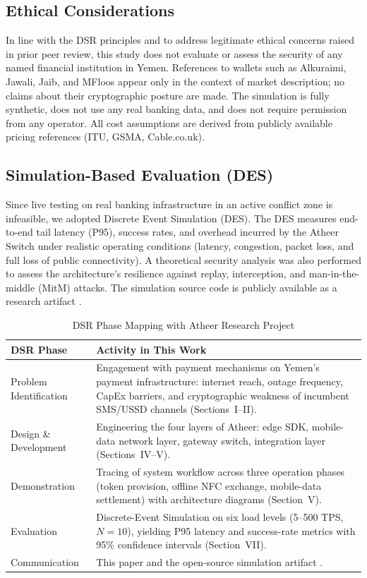 \documentclass[conference,10pt]{IEEEtran}
\begin{document}
\subsection{Ethical Considerations}

In line with the DSR principles and to address legitimate ethical concerns raised in prior peer review, this study does not evaluate or assess the security of any named financial institution in Yemen. References to wallets such as Alkuraimi, Jawali, Jaib, and MFloos appear only in the context of market description; no claims about their cryptographic posture are made. The simulation is fully synthetic, does not use any real banking data, and does not require permission from any operator. All cost assumptions are derived from publicly available pricing references (ITU, GSMA, Cable.co.uk).

\subsection{Simulation-Based Evaluation (DES)}

Since live testing on real banking infrastructure in an active conflict zone is infeasible, we adopted Discrete Event Simulation (DES). The DES measures end-to-end tail latency (P95), success rates, and overhead incurred by the Atheer Switch under realistic operating conditions (latency, congestion, packet loss, and full loss of public connectivity). A theoretical security analysis was also performed to assess the architecture's resilience against replay, interception, and man-in-the-middle (MitM) attacks. The simulation source code is publicly available as a research artifact \cite{mutawakel2024}.

\begin{table}[t]
\caption{DSR Phase Mapping with Atheer Research Project}
\label{tab:dsr}
\centering
\footnotesize
\begin{tabular}{@{}p{2.8cm}p{12cm}@{}}
\toprule
\textbf{DSR Phase} & \textbf{Activity in This Work} \\
\midrule
Problem Identification & Engagement with payment mechanisms on Yemen's payment infrastructure: internet reach, outage frequency, CapEx barriers, and cryptographic weakness of incumbent SMS/USSD channels (Sections~I--II). \\
Design \& Development & Engineering the four layers of Atheer: edge SDK, mobile-data network layer, gateway switch, integration layer (Sections~IV--V). \\
Demonstration & Tracing of system workflow across three operation phases (token provision, offline NFC exchange, mobile-data settlement) with architecture diagrams (Section~V). \\
Evaluation & Discrete-Event Simulation on six load levels (5--500 TPS, $N=10$), yielding P95 latency and success-rate metrics with 95\% confidence intervals (Section~VII). \\
Communication & This paper and the open-source simulation artifact \cite{mutawakel2024}. \\
\bottomrule
\end{tabular}
\end{table}
\end{document}
